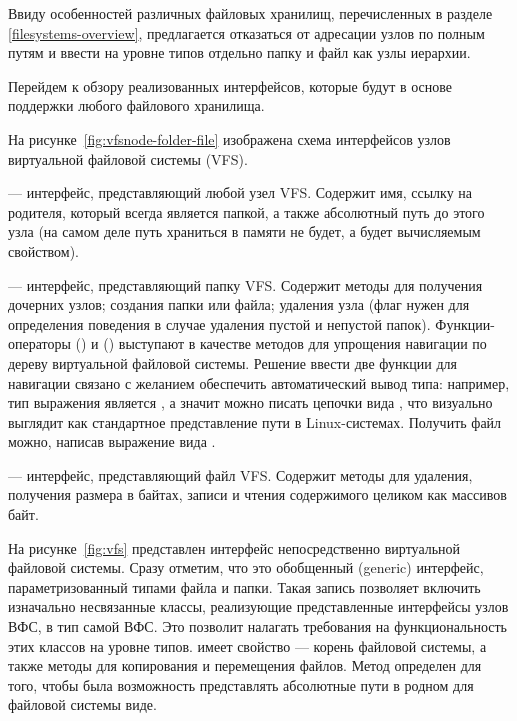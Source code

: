     Ввиду особенностей различных файловых хранилищ, перечисленных в разделе \ref{filesystems-overview}, предлагается отказаться от адресации узлов по полным путям и ввести на уровне типов отдельно папку и файл как узлы иерархии.


    Перейдем к обзору реализованных интерфейсов, которые будут в основе поддержки любого файлового хранилища.
    
    На рисунке~\ref{fig:vfsnode-folder-file} изображена схема интерфейсов узлов виртуальной файловой системы (VFS). 
    
     --- интерфейс, представляющий любой узел VFS. Содержит имя, ссылку на родителя, который всегда является папкой, а также абсолютный путь до этого узла (на самом деле путь храниться в памяти не будет, а будет вычисляемым свойством\cite{kotlin-computed-property}).

     --- интерфейс, представляющий папку VFS. Содержит методы для получения дочерних узлов; создания папки или файла; удаления узла (флаг  нужен для определения поведения в случае удаления пустой и непустой папок). Функции-операторы  (\code{/}) и  (\code{\%}) выступают в качестве методов для упрощения навигации по дереву виртуальной файловой системы. Решение ввести две функции для навигации связано с желанием обеспечить автоматический вывод типа: например, тип выражения  является , а значит можно писать цепочки вида , что визуально выглядит как стандартное представление пути в Linux-системах. Получить файл можно, написав выражение вида .
    
     --- интерфейс, представляющий файл VFS. Содержит методы для удаления, получения размера в байтах, записи и чтения содержимого целиком как массивов байт.

    На рисунке~\ref{fig:vfs} представлен интерфейс непосредственно виртуальной файловой системы. Сразу отметим, что это обобщенный (generic) интерфейс, параметризованный типами файла и папки. Такая запись позволяет включить изначально несвязанные классы, реализующие представленные интерфейсы узлов ВФС, в тип самой ВФС. Это позволит налагать требования на функциональность этих классов на уровне типов.  имеет свойство  --- корень файловой системы, а также методы для копирования и перемещения файлов. Метод  определен для того, чтобы была возможность представлять абсолютные пути в родном для файловой системы виде.

